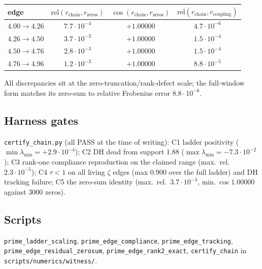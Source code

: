 \documentclass[11pt,reqno]{amsart}
\theoremstyle{plain}
\theoremstyle{definition}
\theoremstyle{remark}
\newcommand{\eigmin}{\lambda_{\min}}
\begin{document}
\begin{center}
\begin{tabular}{lccc}
\toprule
edge & $\mathrm{rel}(r_{\mathrm{chain}}, r_{\mathrm{zeros}})$ &
$\cos(r_{\mathrm{chain}}, r_{\mathrm{zeros}})$ &
$\mathrm{rel}(r_{\mathrm{chain}}, r_{\mathrm{coupling}})$ \\
\midrule
$4.00 \to 4.26$ & $7.7\cdot 10^{-4}$ & $+1.00000$ & $4.7\cdot 10^{-6}$ \\
$4.26 \to 4.50$ & $3.7\cdot 10^{-3}$ & $+1.00000$ & $1.5\cdot 10^{-4}$ \\
$4.50 \to 4.76$ & $2.8\cdot 10^{-3}$ & $+1.00000$ & $1.5\cdot 10^{-4}$ \\
$4.76 \to 4.96$ & $1.2\cdot 10^{-3}$ & $+1.00000$ & $8.8\cdot 10^{-5}$ \\
\bottomrule
\end{tabular}
\end{center}

All discrepancies sit at the zero-truncation/rank-defect scale; the full-window form matches
its zero-sum to relative Frobenius error $8.8\cdot 10^{-6}$.

\subsection*{Harness gates}
\texttt{certify\_chain.py} (all PASS at the time of writing): C1 ladder positivity
($\min \eigmin = +2.9\cdot 10^{-4}$); C2 DH dead from support $1.88$
($\max \eigmin = -7.3\cdot 10^{-2}$); C3 rank-one compliance reproduction on the claimed
range (max.\ rel.\ $2.3\cdot 10^{-5}$); C4 $\tau < 1$ on all living $\zeta$ edges
(max $0.900$ over the full ladder) and DH tracking failure; C5 the zero-sum identity
(max.\ rel.\ $3.7\cdot 10^{-3}$, min.\ cos $1.00000$ against $3000$ zeros).

\subsection*{Scripts}
\texttt{prime\_ladder\_scaling}, \texttt{prime\_edge\_compliance},
\texttt{prime\_edge\_tracking}, \texttt{prime\_edge\_residual\_zerosum},
\texttt{prime\_edge\_rank2\_exact}, \texttt{certify\_chain} in
\texttt{scripts/numerics/witness/}.
\end{document}
